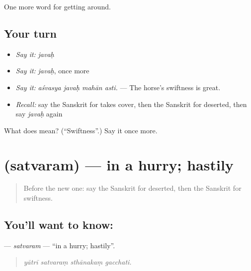\begin{grammarlens}[title={What you've built}]
One more word for getting around.
\end{grammarlens}

\subsection*{Your turn}
\begin{itemize}
\raggedright
  \item \emph{Say it:} \emph{javaḥ}
  \item \emph{Say it:} \emph{javaḥ}, once more
  \item \emph{Say it:} \emph{aśvasya javaḥ mahān asti.} — The horse's swiftness is great.
  \item \emph{Recall:} say the Sanskrit for takes cover, then the Sanskrit for deserted, then say \emph{javaḥ} again
\end{itemize}

\begin{tcolorbox}[breakable,colback=teal!4,colframe=teal!35!black,title={Before you move on}]
What does  mean? (\textquotedblleft{}Swiftness\textquotedblright{}.) Say it once more.
\end{tcolorbox}
\section[\texorpdfstring{\sk{सत्वरम्} (satvaram)}{सत्वरम् (satvaram)}]{ (satvaram) — in a hurry; hastily}

\label{lesson:SA-C405-satvaram}



\begin{quote}
Before the new one: say the Sanskrit for deserted, then the Sanskrit for swiftness.
\end{quote}

\subsection*{You'll want to know: }
\textbf{} — \emph{satvaram} — \textquotedblleft{}in a hurry; hastily\textquotedblright{}.

\begin{quote}
   
\end{quote}

\begin{quote}
\emph{yātrī satvaraṃ sthānakaṃ gacchati.}
\end{quote}

